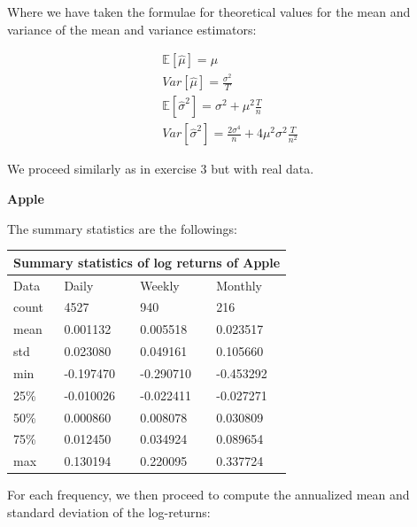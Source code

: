 \documentclass[10pt]{article}
\newcommand{\Ebb}{\mathbb{E}}
\newenvironment{exercise}[2][Exercise]{\begin{trivlist}
  \item[\hskip \labelsep {\bfseries #1}\hskip \labelsep {\bfseries #2.}]}{\end{trivlist}}
\begin{document}
\begin{exercise}{3}
	\bigbreak

	Where we have taken the formulae for theoretical values for the mean and variance of the mean and variance estimators:
	
	\begin{align*}
		\Ebb[\hat{\mu}] = \mu \\
		Var[\hat{\mu}] = \frac{\sigma^{2}}{T} \\
		\Ebb[\hat{\sigma}^{2}] = \sigma^{2} + \mu^{2} \frac{T}{n} \\
		Var[\hat{\sigma}^{2}] = \frac{2\sigma^{4}}{n} + 4\mu^{2}\sigma^{2}\frac{T}{n^{2}}
	\end{align*}
  
  \end{exercise}

  \begin{exercise}{4}
  
	We proceed similarly as in exercise 3 but with real data.
	
	\bigbreak	
		
	\textbf{Apple}
	
	\smallbreak
	
	The summary statistics are the followings:
	
	\bigbreak	
	
	\begin{tabular}{ |p{3cm}||p{3cm}|p{3cm}|p{3cm}|  }
 		\hline
		\multicolumn{4}{|c|}{Summary statistics of log returns of Apple} \\
		\hline
		Data & Daily & Weekly & Monthly\\
 		\hline
 		count   &  4527 & 940 & 216\\
 		mean & 0.001132 & 0.005518 & 0.023517\\
 		std & 0.023080 & 0.049161 & 0.105660\\
 		min & -0.197470 & -0.290710 & -0.453292\\
 		25\% & -0.010026 & -0.022411 & -0.027271\\
 		50\% & 0.000860 & 0.008078 & 0.030809\\
 		75\% & 0.012450 & 0.034924 & 0.089654\\
 		max & 0.130194 & 0.220095 & 0.337724\\
 		\hline
	\end{tabular}
	
	\bigbreak	
	
	For each frequency, we then proceed to compute the annualized mean and standard deviation of the log-returns:
	
	\bigbreak
	

\end{exercise}
\end{document}
